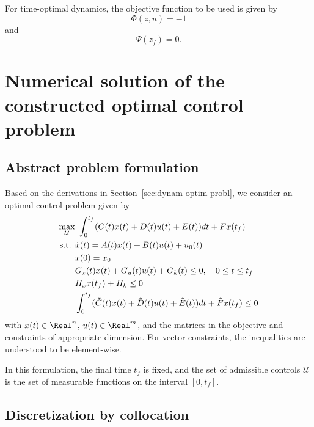 \documentclass[a4paper,11pt,DIV12]{scrartcl}
\theoremstyle{remark}
\begin{document}
For time-optimal dynamics, the objective function to be used is given by
\begin{equation}
  \label{eq:time-optimal-phi-objective}
  \Phi(z,u) = -1
\end{equation}
and
\begin{equation}
  \label{eq:time-optimal-psi-objective}
  \Psi(z_f) = 0.
\end{equation}


\section{Numerical solution of the constructed optimal control problem}
\label{sec:numer-solut-constr}

\subsection{Abstract problem formulation}
\label{sec:abstr-probl-form}

Based on the derivations in Section~\ref{sec:dynam-optim-probl}, we consider an optimal control problem given by
\begin{equation}
  \label{eq:abstract-oc-problem-fixedtime}
  \begin{aligned}
    \max_{\mathcal U} &\ \int_{0}^{t_f} (C(t) x(t) + D(t) u(t) + E(t)) dt + F x(t_f) \\
    \textnormal{s.t. } & \dot x(t) = A(t) x(t) + B(t) u(t) + u_0(t) \\
    & x(0) = x_0 \\
    & G_x(t) x(t) + G_u(t) u(t) + G_k(t) \leq 0, \quad 0 \leq t \leq t_f \\
    & H_x x(t_f) + H_k \leq 0 \\
    & \int_{0}^{t_{f}} (\tilde C(t) x(t) + \tilde D(t) u(t) + \tilde E(t)) dt + \tilde F x(t_{f}) \leq 0
  \end{aligned}
\end{equation}
with $x(t) \in \Real^n$, $u(t) \in \Real^m$, and the matrices in the objective and constraints of appropriate dimension.
For vector constraints, the inequalities are understood to be element-wise.

In this formulation, the final time $t_f$ is fixed, and the set of admissible controls $\mathcal U$ is the set of measurable functions on the interval $[0, t_f]$.

\subsection{Discretization by collocation}
\label{sec:appr-coll}
\end{document}
